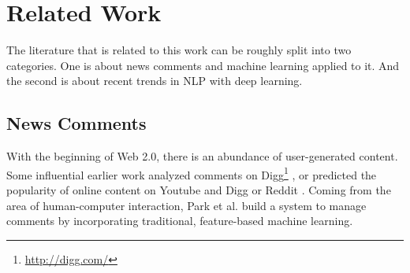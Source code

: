 \section{Related Work}

The literature that is related to this work can be roughly split into two categories. One is about news comments and machine learning applied to it. And the second is about recent trends in NLP with deep learning.

\subsection{News Comments}
With the beginning of Web 2.0, there is an abundance of user-generated content. Some influential earlier work analyzed comments on Digg\footnote{\url{http://digg.com/}} \cite{Gomez:2008:SAS:1367497.1367585, Lampe:2004:SBD:985692.985761}, or predicted the popularity of online content on Youtube and Digg \cite{Szabo:2010:PPO:1787234.1787254} or Reddit \cite{Rizos:2016:PNP:2872518.2890096}. Coming from the area of human-computer interaction, Park et al. \cite{Park:2016:SCM:2858036.2858389} build a system to manage comments by incorporating traditional, feature-based machine learning.

